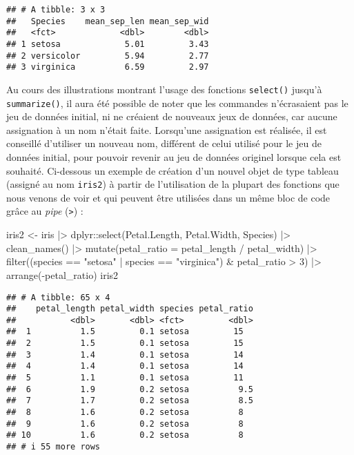 \documentclass[
]{book}
\newenvironment{Shaded}{\begin{snugshade}}{\end{snugshade}}
\newcommand{\AttributeTok}[1]{\textcolor[rgb]{0.77,0.63,0.00}{#1}}
\newcommand{\DecValTok}[1]{\textcolor[rgb]{0.00,0.00,0.81}{#1}}
\newcommand{\FunctionTok}[1]{\textcolor[rgb]{0.00,0.00,0.00}{#1}}
\newcommand{\NormalTok}[1]{#1}
\newcommand{\OtherTok}[1]{\textcolor[rgb]{0.56,0.35,0.01}{#1}}
\newcommand{\SpecialCharTok}[1]{\textcolor[rgb]{0.00,0.00,0.00}{#1}}
\newcommand{\StringTok}[1]{\textcolor[rgb]{0.31,0.60,0.02}{#1}}
\begin{document}
\begin{verbatim}
## # A tibble: 3 x 3
##   Species    mean_sep_len mean_sep_wid
##   <fct>             <dbl>        <dbl>
## 1 setosa             5.01         3.43
## 2 versicolor         5.94         2.77
## 3 virginica          6.59         2.97
\end{verbatim}

Au cours des illustrations montrant l'usage des fonctions \texttt{select()} jusqu'à \texttt{summarize()}, il aura été possible de noter que les commandes n'écrasaient pas le jeu de données initial, ni ne créaient de nouveaux jeux de données, car aucune assignation à un nom n'était faite. Lorsqu'une assignation est réalisée, il est conseillé d'utiliser un nouveau nom, différent de celui utilisé pour le jeu de données initial, pour pouvoir revenir au jeu de données originel lorsque cela est souhaité. Ci-dessous un exemple de création d'un nouvel objet de type tableau (assigné au nom \texttt{iris2}) à partir de l'utilisation de la plupart des fonctions que nous venons de voir et qui peuvent être utilisées dans un même bloc de code grâce au \emph{pipe} (\texttt{\textbar{}\textgreater{}}) :

\begin{Shaded}
\begin{Highlighting}[]
\NormalTok{iris2 }\OtherTok{\textless{}{-}}
\NormalTok{  iris }\SpecialCharTok{|\textgreater{}}
\NormalTok{  dplyr}\SpecialCharTok{::}\FunctionTok{select}\NormalTok{(Petal.Length, Petal.Width, Species) }\SpecialCharTok{|\textgreater{}}
  \FunctionTok{clean\_names}\NormalTok{() }\SpecialCharTok{|\textgreater{}}
  \FunctionTok{mutate}\NormalTok{(}\AttributeTok{petal\_ratio =}\NormalTok{ petal\_length }\SpecialCharTok{/}\NormalTok{ petal\_width) }\SpecialCharTok{|\textgreater{}}
  \FunctionTok{filter}\NormalTok{((species }\SpecialCharTok{==} \StringTok{"setosa"} \SpecialCharTok{|}
\NormalTok{            species }\SpecialCharTok{==} \StringTok{"virginica"}\NormalTok{) }\SpecialCharTok{\&}\NormalTok{ petal\_ratio }\SpecialCharTok{\textgreater{}} \DecValTok{3}\NormalTok{) }\SpecialCharTok{|\textgreater{}}
  \FunctionTok{arrange}\NormalTok{(}\SpecialCharTok{{-}}\NormalTok{petal\_ratio)}
\NormalTok{iris2}
\end{Highlighting}
\end{Shaded}

\begin{verbatim}
## # A tibble: 65 x 4
##    petal_length petal_width species petal_ratio
##           <dbl>       <dbl> <fct>         <dbl>
##  1          1.5         0.1 setosa         15  
##  2          1.5         0.1 setosa         15  
##  3          1.4         0.1 setosa         14  
##  4          1.4         0.1 setosa         14  
##  5          1.1         0.1 setosa         11  
##  6          1.9         0.2 setosa          9.5
##  7          1.7         0.2 setosa          8.5
##  8          1.6         0.2 setosa          8  
##  9          1.6         0.2 setosa          8  
## 10          1.6         0.2 setosa          8  
## # i 55 more rows
\end{verbatim}
\end{document}

